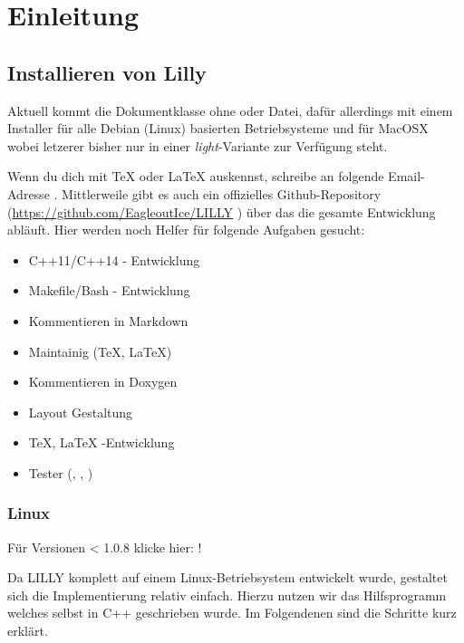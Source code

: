 \chapter{Einleitung}
\section{Installieren von Lilly}
Aktuell kommt die Dokumentklasse ohne  oder  Datei, dafür allerdings mit einem Installer für alle Debian (Linux) basierten Betriebsysteme und für MacOSX wobei letzerer bisher nur in einer
\emph{light}-Variante zur Verfügung steht.

\begin{bemerkung}[Mithilfe]
    Wenn du dich mit \TeX{} oder \LaTeX{} auskennst, schreibe an folgende Email-Adresse \T{\AUTHORMAIL}.\smallskip\newline
    Mittlerweile gibt es auch ein offizielles Github-Repository (\url{https://github.com/EagleoutIce/LILLY} \href{https://github.com/EagleoutIce/LILLY}{\faGithub})
    über das die gesamte Entwicklung abläuft. Hier werden noch Helfer für folgende Aufgaben gesucht:
    \begin{multicols}{2}
        \begin{itemize}[label=$\diamond$]
            \item C++11/C++14 - Entwicklung
            \item Makefile/Bash - Entwicklung
            \item Kommentieren in Markdown
            \item Maintainig (\TeX, \LaTeX)
            \item Kommentieren in Doxygen
            \item Layout Gestaltung
            \item \TeX, \LaTeX{} -Entwicklung
            \item Tester (\faLinux, \faApple, \faWindows)
        \end{itemize}
    \end{multicols}
\end{bemerkung}

\subsection{Linux}
\begin{center}
    Für Versionen < 1.0.8 klicke hier: !
\end{center}
Da LILLY komplett auf einem Linux-Betriebsystem entwickelt wurde, gestaltet sich die Implementierung relativ einfach. 
Hierzu nutzen wir das Hilfsprogramm \Jake welches selbst in C++ geschrieben wurde. 
Im Folgendenen sind die Schritte kurz erklärt. 
